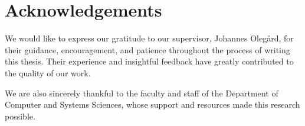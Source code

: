 \chapter*{Acknowledgements}

We would like to express our gratitude to our supervisor, Johannes Olegård, for their guidance, 
encouragement, and patience throughout the process of writing this thesis. 
Their experience and insightful feedback have greatly contributed to the quality of our work.

We are also sincerely thankful to the faculty and staff of the Department of Computer and Systems Sciences, 
whose support and resources made this research possible.
